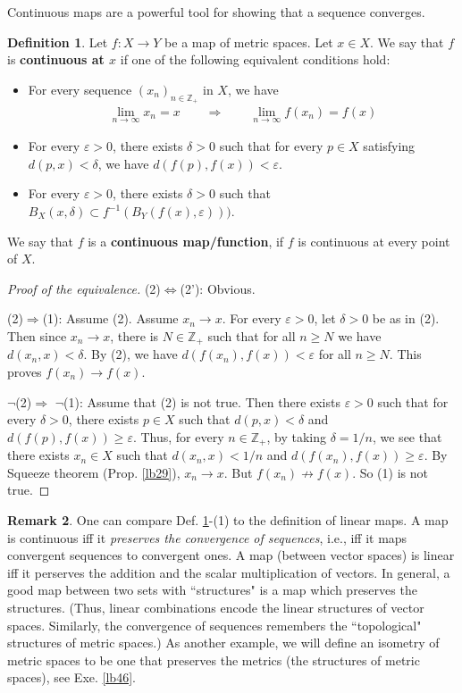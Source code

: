 \documentclass[12pt,b5paper,notitlepage]{article}
\theoremstyle{definition}
\newtheorem{df}{Definition}[section]
\newtheorem{rem}[df]{Remark}
\theoremstyle{plain}
\newcommand{\Zbb}{\mathbb Z}
\numberwithin{equation}{section}
\begin{document}
Continuous maps are a powerful tool for showing that a sequence converges.


\begin{df}\label{lb31}
Let $f:X\rightarrow Y$ be a map of metric spaces. Let $x\in X$. We say that $f$ is \textbf{continuous at $x$} if one of the following equivalent conditions hold:
\begin{itemize}[align=left]
\item [(1)] For every sequence $(x_n)_{n\in\Zbb_+}$ in $X$, we have
\begin{align*}
\lim_{n\rightarrow\infty} x_n=x\qquad\Longrightarrow\qquad \lim_{n\rightarrow\infty} f(x_n)=f(x)
\end{align*}
\item[(2)] For every $\varepsilon>0$, there exists $\delta>0$ such that for every $p\in X$ satisfying $d(p,x)<\delta$, we have $d(f(p),f(x))<\varepsilon$.
\item[(2')] For every $\varepsilon>0$, there exists $\delta>0$ such that $B_X(x,\delta)\subset f^{-1}(B_Y(f(x),\varepsilon)))$.
\end{itemize}
We say that $f$ is a \textbf{continuous map/function}, if $f$ is continuous at every point of $X$.
\end{df}

\begin{proof}[Proof of the equivalence]
(2)$\Leftrightarrow$(2'): Obvious.

(2)$\Rightarrow$(1): Assume (2). Assume $x_n\rightarrow x$. For every $\varepsilon>0$, let $\delta>0$ be as in (2). Then since $x_n\rightarrow x$, there is $N\in\Zbb_+$ such that for all $n\geq N$ we have $d(x_n,x)<\delta$. By (2), we have $d(f(x_n),f(x))<\varepsilon$ for all $n\geq N$. This proves $f(x_n)\rightarrow f(x)$.

$\neg$(2)$\Rightarrow$ $\neg$(1): Assume that (2) is not true. Then there exists $\varepsilon>0$ such that for every $\delta>0$, there exists $p\in X$ such that $d(p,x)<\delta$ and $d(f(p),f(x))\geq\varepsilon$. Thus, for every $n\in\Zbb_+$, by taking $\delta=1/n$, we see that there exists $x_n\in X$ such that $d(x_n,x)<1/n$ and $d(f(x_n),f(x))\geq\varepsilon$. By Squeeze theorem (Prop. \ref{lb29}), $x_n\rightarrow x$. But $f(x_n)\nrightarrow f(x)$. So (1) is not true.
\end{proof}

\begin{rem}
One can compare Def. \ref{lb31}-(1) to the definition of linear maps. A map is continuous iff it \emph{preserves the convergence of sequences}, i.e., iff it maps convergent sequences to convergent ones. A map (between vector spaces) is linear iff it perserves the addition and the scalar multiplication of vectors. In general, a good map between two sets with ``structures" is a map which preserves the structures. (Thus, linear combinations encode the linear structures of vector spaces. Similarly, the convergence of sequences remembers the ``topological" structures of metric spaces.) As another example, we will define an isometry of metric spaces to be one that preserves the metrics (the structures of metric spaces), see Exe. \ref{lb46}.
\end{rem}
\end{document}

